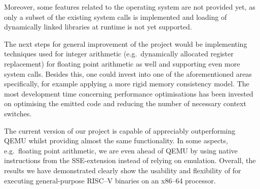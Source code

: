 Moreover, some features related to the operating system are not provided yet, as only a subset of the existing system calls is implemented and loading of dynamically linked libraries at runtime is not yet supported.

The next steps for general improvement of the project would be implementing techniques used for integer arithmetic (e.g.\ dynamically allocated register replacement) for floating point arithmetic as well and supporting even more system calls.
Besides this, one could invest into one of the aforementioned areas specifically, for example applying a more rigid memory consistency model.
The most development time concerning performance optimisations has been invested on optimising the emitted code and reducing the number of necessary context switches.

The current version of our project is capable of appreciably outperforming QEMU whilst providing almost the same functionality.
In some aspects, e.g.\ floating point arithmetic, we are even ahead of QEMU by using native instructions from the SSE-extension instead of relying on emulation.
Overall, the results we have demonstrated clearly show the usability and flexibility of \translatorname{} for executing general-purpose RISC--V binaries on an x86--64 processor.